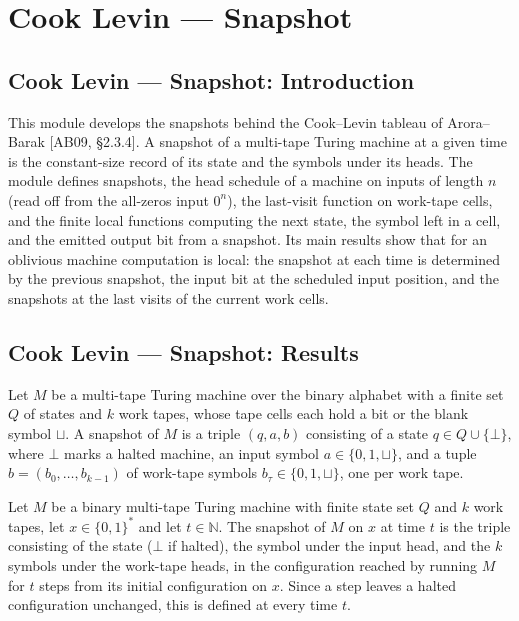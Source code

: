 \section{Cook Levin --- Snapshot}
\subsection*{Cook Levin --- Snapshot: Introduction}

This module develops the snapshots behind the Cook--Levin tableau of Arora--Barak
[AB09, \S 2.3.4]. A snapshot of a multi-tape Turing machine at a given time is the
constant-size record of its state and the symbols under its heads. The module defines
snapshots, the head schedule of a machine on inputs of length $n$ (read off from the
all-zeros input $0^n$), the last-visit function on work-tape cells, and the finite local
functions computing the next state, the symbol left in a cell, and the emitted output bit
from a snapshot. Its main results show that for an oblivious machine computation is local:
the snapshot at each time is determined by the previous snapshot, the input bit at the
scheduled input position, and the snapshots at the last visits of the current work cells.

\subsection*{Cook Levin --- Snapshot: Results}

\begin{definition}
\label{Complexity.Snapshot}
\leanok
{}
Let $M$ be a multi-tape Turing machine over the binary alphabet with a finite set $Q$ of
states and $k$ work tapes, whose tape cells each hold a bit or the blank symbol $\sqcup$.
A snapshot of $M$ is a triple $(q, a, b)$ consisting of a state $q \in Q \cup \{\bot\}$,
where $\bot$ marks a halted machine, an input symbol $a \in \{0, 1, \sqcup\}$, and a tuple
$b = (b_0, \dots, b_{k-1})$ of work-tape symbols $b_\tau \in \{0, 1, \sqcup\}$, one per work
tape.
\end{definition}

\begin{definition}
\label{Complexity.snapshotAt}
\leanok
{}
Let $M$ be a binary multi-tape Turing machine with finite state set $Q$ and $k$ work tapes,
let $x \in \{0,1\}^*$ and let $t \in \mathbb{N}$. The snapshot of $M$ on $x$ at time $t$ is
the triple consisting of the state ($\bot$ if halted), the symbol under the input head, and
the $k$ symbols under the work-tape heads, in the configuration reached by running $M$ for
$t$ steps from its initial configuration on $x$. Since a step leaves a halted configuration
unchanged, this is defined at every time $t$.
\end{definition}

